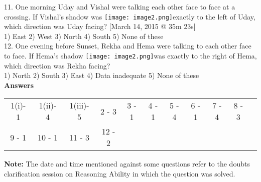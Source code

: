 \documentclass[
]{article}
\begin{document}
11. One morning Uday and Vishal were talking each other face to face at a crossing. If Vishal’s
shadow was \texttt{[image: image2.png]}exactly to the left of Uday, which direction was Uday facing?
[March 14, 2015 @ 35m 23s]\\
1) East \hspace{2mm}2) West \hspace{2mm}3) North \hspace{2mm}4) South \hspace{2mm}5) None of these\\

12. One evening before Sunset, Rekha and Hema were talking to each other face to face. If Hema’s shadow \texttt{[image: image2.png]}was exactly to the right of Hema, which direction was Rekha facing?\\
1) North \hspace{2mm}2) South \hspace{2mm}3) East
\hspace{2mm}4) Data inadequate \hspace{2mm}5) None of these\\

\textbf{Answers}\\
\begin{tabular}{c c c c c c c c c c c }
1(i)- 1& 1(ii)- 4& 1(iii)- 5& 2 - 3& 3 - 1& 4 - 1& 5 - 4& 6 - 1& 7 - 4& 8 - 3\\
9 - 1 &10 - 1& 11 - 3 &12 - 2\\
\end{tabular}


\textbf{Note:} The date and time mentioned against some questions refer to the doubts clarification
session on Reasoning Ability in which the question was solved.\\
\end{document}
